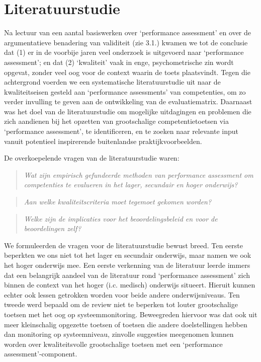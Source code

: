 \documentclass[
  letterpaper,
]{report}
\begin{document}
\hypertarget{literatuurstudie}{%
\section{Literatuurstudie}\label{literatuurstudie}}

Na lectuur van een aantal basiswerken over `performance assessment' en
over de argumentatieve benadering van validiteit (zie 3.1.) kwamen we
tot de conclusie dat (1) er in de voorbije jaren veel onderzoek is
uitgevoerd naar `performance assessment'; en dat (2) `kwaliteit' vaak in
enge, psychometrische zin wordt opgevat, zonder veel oog voor de context
waarin de toets plaatsvindt. Tegen die achtergrond voerden we een
systematische literatuurstudie uit naar de kwaliteitseisen gesteld aan
`performance assessments' van competenties, om zo verder invulling te
geven aan de ontwikkeling van de evaluatiematrix. Daarnaast was het doel
van de literatuurstudie om mogelijke uitdagingen en problemen die zich
aandienen bij het opzetten van grootschalige competentietoetsen via
`performance assessment', te identificeren, en te zoeken naar relevante
input vanuit potentieel inspirerende buitenlandse praktijkvoorbeelden.

De overkoepelende vragen van de literatuurstudie waren:

\begin{quote}
\emph{Wat zijn empirisch gefundeerde methoden van performance assessment
om competenties te evalueren in het lager, secundair en hoger
onderwijs?}
\end{quote}

\begin{quote}
\emph{Aan welke kwaliteitscriteria moet tegemoet gekomen worden?}
\end{quote}

\begin{quote}
\emph{Welke zijn de implicaties voor het beoordelingsbeleid en voor de
beoordelingen zelf?}
\end{quote}

We formuleerden de vragen voor de literatuurstudie bewust breed. Ten
eerste beperkten we ons niet tot het lager en secundair onderwijs, maar
namen we ook het hoger onderwijs mee. Een eerste verkenning van de
literatuur leerde immers dat een belangrijk aandeel van de literatuur
rond `performance assessment' zich binnen de context van het hoger (i.c.
medisch) onderwijs situeert. Hieruit kunnen echter ook lessen getrokken
worden voor beide andere onderwijsniveaus. Ten tweede werd bepaald om de
review niet te beperken tot louter grootschalige toetsen met het oog op
systeemmonitoring. Beweegreden hiervoor was dat ook uit meer
kleinschalig opgezette toetsen of toetsen die andere doelstellingen
hebben dan monitoring op systeemniveau, zinvolle suggesties meegenomen
kunnen worden over kwaliteitsvolle grootschalige toetsen met een
`performance assessment'-component.
\end{document}

